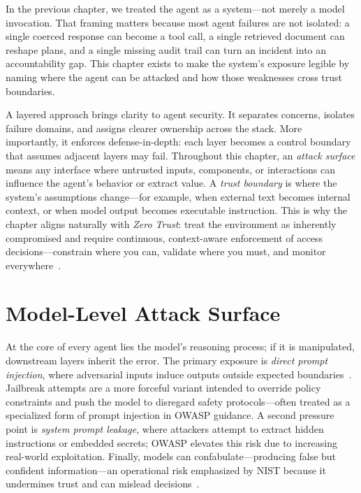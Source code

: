 \begin{TNtwocol}

  In the previous chapter, we treated the agent as a system—not merely a model invocation. That framing matters because most agent failures are not isolated: a single coerced response can become a tool call, a single retrieved document can reshape plans, and a single missing audit trail can turn an incident into an accountability gap. This chapter exists to make the system's exposure legible by naming where the agent can be attacked and how those weaknesses cross trust boundaries.

  \medskip

  A layered approach brings clarity to agent security. It separates concerns, isolates failure domains, and assigns clearer ownership across the stack. More importantly, it enforces defense-in-depth: each layer becomes a control boundary that assumes adjacent layers may fail. Throughout this chapter, an \emph{attack surface} means any interface where untrusted inputs, components, or interactions can influence the agent's behavior or extract value. A \emph{trust boundary} is where the system's assumptions change—for example, when external text becomes internal context, or when model output becomes executable instruction. This is why the chapter aligns naturally with \emph{Zero Trust}: treat the environment as inherently compromised and require continuous, context-aware enforcement of access decisions—constrain where you can, validate where you must, and monitor everywhere~\cite{nist-sp800-207,cisa-ztmm-v2}.

  \section{Model-Level Attack Surface}

  At the core of every agent lies the model's reasoning process; if it is manipulated, downstream layers inherit the error. The primary exposure is \emph{direct prompt injection}, where adversarial inputs induce outputs outside expected boundaries~\cite{owasp-top10-llm-2025,owasp-prompt-injection-cheatsheet}. Jailbreak attempts are a more forceful variant intended to override policy constraints and push the model to disregard safety protocols—often treated as a specialized form of prompt injection in OWASP guidance. A second pressure point is \emph{system prompt leakage}, where attackers attempt to extract hidden instructions or embedded secrets; OWASP elevates this risk due to increasing real-world exploitation. Finally, models can confabulate—producing false but confident information—an operational risk emphasized by NIST because it undermines trust and can mislead decisions~\cite{nist-genai-600-1}.


\end{TNtwocol}
